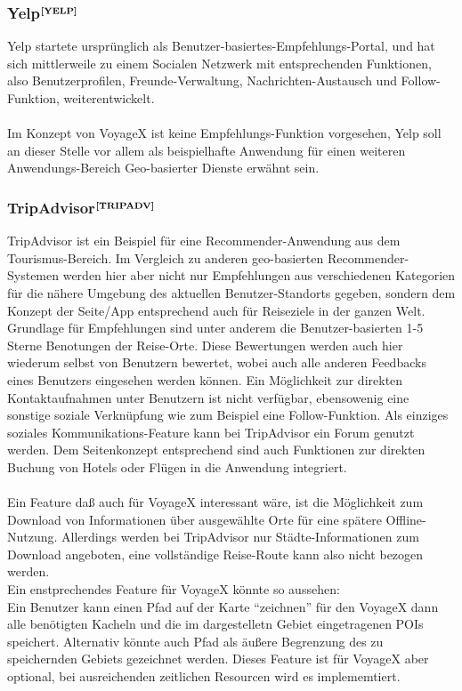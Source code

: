 \subsubsection[Yelp]{Yelp$^{\textbf{\ref{YELP}}}$}%
\addtocounter{footnote}{1}
Yelp startete ursprünglich als Benutzer-basiertes-Empfehlungs-Portal, und hat sich mittlerweile zu einem Socialen Netzwerk mit entsprechenden Funktionen, also Benutzerprofilen, Freunde-Verwaltung, Nachrichten-Austausch und Follow-Funktion, weiterentwickelt.\\ \\
Im Konzept von VoyageX ist keine Empfehlungs-Funktion vorgesehen, Yelp soll an dieser Stelle vor allem als beispielhafte Anwendung für einen weiteren Anwendungs-Bereich Geo-basierter Dienste erwähnt sein.

\subsubsection[TripAdvisor]{TripAdvisor$^{\textbf{\ref{TRIPADV}}}$}%
\addtocounter{footnote}{1}
TripAdvisor ist ein Beispiel für eine Recommender-Anwendung aus dem Tourismus-Bereich. Im Vergleich zu anderen geo-basierten Recommender-Systemen werden hier aber nicht nur Empfehlungen aus verschiedenen Kategorien für die nähere Umgebung des aktuellen Benutzer-Standorts gegeben, sondern dem Konzept der Seite/App entsprechend auch für Reiseziele in der ganzen Welt.\\
Grundlage für Empfehlungen sind unter anderem die Benutzer-basierten 1-5 Sterne Benotungen der Reise-Orte. Diese Bewertungen werden auch hier wiederum selbst von Benutzern bewertet, wobei auch alle anderen Feedbacks eines Benutzers eingesehen werden können. Ein Möglichkeit zur direkten Kontaktaufnahmen unter Benutzern ist nicht verfügbar, ebensowenig eine sonstige soziale Verknüpfung wie zum Beispiel eine Follow-Funktion. Als einziges soziales Kommunikations-Feature kann bei TripAdvisor ein Forum genutzt werden. Dem Seitenkonzept entsprechend sind auch Funktionen zur direkten Buchung von Hotels oder Flügen in die Anwendung integriert.\\ \\
Ein Feature daß auch für VoyageX interessant wäre, ist die Möglichkeit zum Download von Informationen über ausgewählte Orte für eine spätere Offline-Nutzung. Allerdings werden bei TripAdvisor nur Städte-Informationen zum Download angeboten, eine vollständige Reise-Route kann also nicht bezogen werden.\\
Ein enstprechendes Feature für VoyageX könnte so aussehen:\\
Ein Benutzer kann einen Pfad auf der Karte "`zeichnen"' für den VoyageX dann alle benötigten Kacheln und die im dargestelletn Gebiet eingetragenen POIs speichert. Alternativ könnte auch Pfad als äußere Begrenzung des zu speichernden Gebiets gezeichnet werden.
Dieses Feature ist für VoyageX aber optional, bei ausreichenden zeitlichen Resourcen wird es implememtiert.


